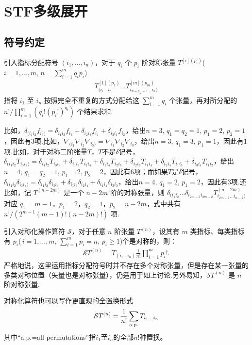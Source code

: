 
\chapter{STF多级展开}

\section{符号约定}

引入指标分配符号 \((i_1, \dots, i_n)\)，对于 \(q_i\) 个 \(p_i\) 阶对称张量 \(T^{[i](p_i)}\)(\(i=1,\dots,m,\,n=\sum_{i=1}^m q_i p_i \))
\begin{align*}
	T^{[1](p_1)}_{(i_1 \dots i_{p_1}} \dots T^{[m](p_m)}_{i_{n-p_m+1} \dots i_n)}
\end{align*}
指将 \(i_1\) 至 \(i_n\) 按照完全不重复的方式分配给这 \(\sum_{i=1}^m q_i\) 个张量，再对所分配的 \(n!/\prod_{i=1}^m (q_i! (p_i!)^{q_i})\) 个结果求和.

比如，\(\delta_{(i_1i_2}f_{i_3)}=\delta_{i_1i_2}f_{i_3}+\delta_{i_2i_3}f_{i_1}+\delta_{i_3i_1}f_{i_2}\)，给出\(n=3,\,q_1=q_2=1,\,p_1=2,\,p_2=1\)，因此有3项.比如，\(\nabla_{(i_1}\nabla_{i_2}\nabla_{i_3)}=\nabla_{i_1}\nabla_{i_2}\nabla_{i_3}\)，给出\(n=3,\,q_1=3,\,p_1=1\)，因此有1项.比如，对于对称二阶张量\(T\)，\(T\)不是\(\delta\)记号，\(\delta_{(i_1 i_2}T_{i_3 i_4)}=\delta_{i_1 i_2}T_{i_3 i_4}+\delta_{i_1 i_3}T_{i_2 i_4}+\delta_{i_1 i_4}T_{i_2 i_3}+\delta_{i_2 i_3}T_{i_1 i_4}+\delta_{i_2 i_4}T_{i_1 i_3}+\delta_{i_3 i_4}T_{i_1 i_2}\)，给出\(n=4,\,q_1=q_2=1,\,p_1=2,\,p_2=2\)，因此有6项；而如果\(T\)是\(\delta\)记号，\(\delta_{(i_1 i_2}\delta_{i_3 i_4)}=\delta_{i_1 i_2}\delta_{i_3 i_4}+\delta_{i_1 i_3}\delta_{i_2 i_4}+\delta_{i_1 i_4}\delta_{i_2 i_3}\)，给出\(n=4,\,q_1=2,\,p_1=2\)，因此有3项.还比如，记 \(T^{(n-2m)}\) 是一个 \(n-2m\) 阶的对称张量，则 \(\delta_{(i_1 i_2} \dots \delta_{i_{2m-3} i_{2m-2}} T^{(n-2m)}_{i_{2m-1} \dots i_{n-2})}\) 对应 \(q_1 = m-1\)，\(p_1 = 2\)，\(q_2 = 1\)，\(p_2 = n-2m\)，式中共有 \(n!/(2^{m-1} (m-1)! (n-2m)!)\) 项.

引入对称化操作算符 \(\mathcal{S}\)，对于任意 \(n\) 阶张量 \(T^{(n)}\)，设其有 \(m\) 类指标、每类指标有 \(p_i\)(\(\,i=1,\dots,m,\,\sum_{i=1}^mp_i=n,\,p_i\geq 1\))个是对称的，则：
\begin{align*}
	\mathcal{S} T^{(n)} = T_{(i_1 \dots i_n)}\frac{1}{n!} \prod_{i=1}^m p_i!.
\end{align*}
严格地说，这里运用指标分配符号时并不存在多个对称张量，但是存在某一张量的多类对称位置（矢量也是对称张量），仍适用于如上讨论.另外易知，\(\mathcal{S} T^{(n)}\) 是 \(n\) 阶对称张量.
\begin{note}
	对称化算符也可以写作更直观的全置换形式
	\begin{align*}
		\mathcal{S} T^{(n)} = \frac{1}{n!}\sum_{\rm a.p.} T_{i_1 \dots i_n}
	\end{align*}
	其中“a.p.=all permutations”指\(i_1\)至\(i_n\)的全部\(n!\)种置换。
\end{note}

